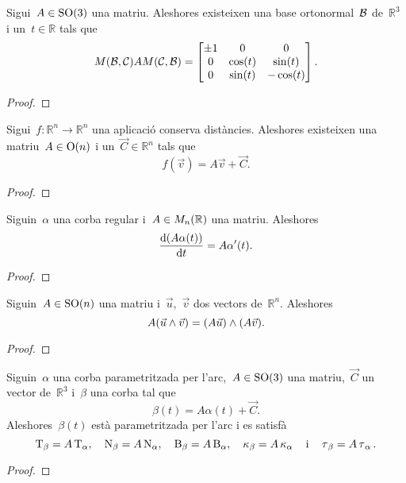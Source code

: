 \documentclass[../../main.tex]{subfiles}
\begin{document}
	\begin{proposition}
		Sigui~\(A\in\operatorname{SO}(3)\) una matriu.
		Aleshores existeixen una base ortonormal~\(\mathcal{B}\) de~\(\mathbb{R}^{3}\) i un~\(t\in\mathbb{R}\) tals que
		\[M(\mathcal{B},\mathcal{C})AM(\mathcal{C},\mathcal{B})=\begin{bmatrix}
			\pm1 & 0 & 0 \\
			0 & \cos(t) & \sin(t) \\
			0 & \sin(t) & -\cos(t)
		\end{bmatrix}.\]
		\begin{proof}
		\end{proof}
	\end{proposition}
	\begin{proposition}
		\label{prop:forma matricial de les aplicacions que conserven distàncies}
		Sigui~\(f\colon\mathbb{R}^{n}\longrightarrow\mathbb{R}^{n}\) una aplicació conserva distàncies.
		Aleshores existeixen una matriu~\(A\in\operatorname{O}(n)\) i un~\(\vec{C}\in\mathbb{R}^{n}\) tals que
		\[
		    f(\vec{v})=A\vec{v}+\vec{C}.
		\]
		\begin{proof}
		\end{proof}
	\end{proposition}
	\begin{proposition}
		\label{prop:derivada del producte d'una matriu per una corba}
		Siguin~\(\alpha\) una corba regular i~\(A\in M_{n}(\mathbb{R})\) una matriu.
		Aleshores
		\[
		    \frac{\mathop{}\!\mathrm{d}(A\alpha(t))}{\mathop{}\!\mathrm{d} t}=A\alpha'(t).
		\]
		\begin{proof}
		\end{proof}
	\end{proposition}
	\begin{proposition}
		\label{prop:les matrius especials ortogonals conserven el producte vectorial}
		Siguin~\(A\in\operatorname{SO}(n)\) una matriu i~\(\vec{u}\),~\(\vec{v}\) dos vectors de~\(\mathbb{R}^{n}\).
		Aleshores
		\[
		    A(\vec{u}\mathbin{\wedge}\vec{v})=(A\vec{u})\mathbin{\wedge}(A\vec{v}).
		\]
		\begin{proof}
		\end{proof}
	\end{proposition}
	\begin{corollary}
		\label{cor:una corba parametritzada per l'arc i la seva imatge per una aplicació que conserva les distàncies són equivalents}
		Siguin~\(\alpha\) una corba parametritzada per l'arc,~\(A\in\operatorname{SO}(3)\) una matriu,~\(\vec{C}\) un vector de~\(\mathbb{R}^{3}\) i~\(\beta\) una corba tal que
		\[
		    \beta(t)=A\alpha(t)+\vec{C}.
		\]
		Aleshores~\(\beta(t)\) està parametritzada per l'arc i es satisfà
		\[
		    \operatorname{T}_{\beta}=A\operatorname{T}_{\alpha},\quad\operatorname{N}_{\beta}=A\operatorname{N}_{\alpha},\quad\operatorname{B}_{\beta}=A\operatorname{B}_{\alpha},\quad\operatorname{\kappa}_{\beta}=A\operatorname{\kappa}_{\alpha}\quad\text{i}\quad\operatorname{\tau}_{\beta}=A\operatorname{\tau}_{\alpha}.
		\]
		\begin{proof}
		\end{proof}
	\end{corollary}
\end{document}
